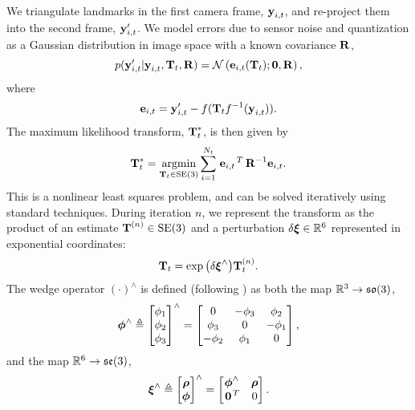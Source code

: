 We triangulate landmarks in the first camera frame, $\boldsymbol{\mathbf{y}}_{i,t}$, and re-project
them into the second frame, $\boldsymbol{\mathbf{y}}_{i,t}'$. We model errors due to sensor noise
and quantization as a Gaussian distribution in image space with a known covariance
$\boldsymbol{\mathbf{R}}$,
\begin{equation}
  p(\boldsymbol{\mathbf{y}}_{i,t}' \vert \boldsymbol{\mathbf{y}}_{i,t}, \boldsymbol{\mathbf{T}}_t,
  \boldsymbol{\mathbf{R}})
  =\mathcal{N}\left(\boldsymbol{\mathbf{e}}_{i,t}(\boldsymbol{\mathbf{T}}_t); \boldsymbol{\mathbf{0}}, \boldsymbol{\mathbf{R}}\right), 
\end{equation}
where
\begin{equation}
 \boldsymbol{\mathbf{e}}_{i,t} = \boldsymbol{\mathbf{y}}_{i,t}' - f( \boldsymbol{\mathbf{T}}_t 
    f^{-1}( \boldsymbol{\mathbf{y}}_{i,t} ) ).	
   \label{eq:image_error}
\end{equation}
  The maximum likelihood transform,
$\boldsymbol{\mathbf{T}}_t^*$, is then given by 
\begin{equation}
  \boldsymbol{\mathbf{T}}_t^* = \operatorname*{argmin}_{\boldsymbol{\mathbf{T}}_t\in\text{SE}(3)}\sum_{i=1}^{N_t} 
  \left.{\boldsymbol{\mathbf{e}}_{i,t}}\right.^T \boldsymbol{\mathbf{R}}^{-1} \boldsymbol{\mathbf{e}}_{i,t}.
\end{equation}
This is a nonlinear least squares problem, and can be solved iteratively using
standard techniques. During iteration $n$, we represent the transform as the
product of an estimate $\boldsymbol{\mathbf{T}}^{(n)}\in\text{SE}(3)$ and a perturbation
$\delta\Vector{\xi}\in\RealNumbers[6]$ represented in exponential
coordinates:
\begin{equation}
  \boldsymbol{\mathbf{T}}_t = \exp{\left( \delta \boldsymbol{\mathbf{\xi}} ^{\wedge}
  \right)} \boldsymbol{\mathbf{T}}_t^{(n)}.
\end{equation}
The wedge operator $(\cdot)^\wedge$ is defined (following
\citet{barfoot2014associating}) as both the map
$\RealNumbers[3]\to\mathfrak{so}(3)$,  
\begin{equation}
\boldsymbol{\mathbf{\phi}} ^\wedge \triangleq \begin{bmatrix} \phi_1 \\ \phi_2 \\ \phi_3 \end{bmatrix}^\wedge	= \begin{bmatrix} 0 &
-\phi_3 & \phi_2 \\ \phi_3 & 0 & -\phi_1 \\ -\phi_2 & \phi_1 & 0 \end{bmatrix},
\label{eq:wedgeOpRotation}
\end{equation}
and the map $\RealNumbers[6]\to\mathfrak{se}(3)$,
\begin{equation}
  \boldsymbol{\mathbf{\xi}}^\wedge \triangleq \begin{bmatrix} \boldsymbol{\mathbf{\rho}} \\ \boldsymbol{\mathbf{\phi}} \end{bmatrix} ^\wedge = \begin{bmatrix}
  \boldsymbol{\mathbf{\phi}}^\wedge & \boldsymbol{\mathbf{\rho}} \\ \left.{\boldsymbol{\mathbf{0}}}\right.^T &  0 \end{bmatrix}.	
\end{equation}
